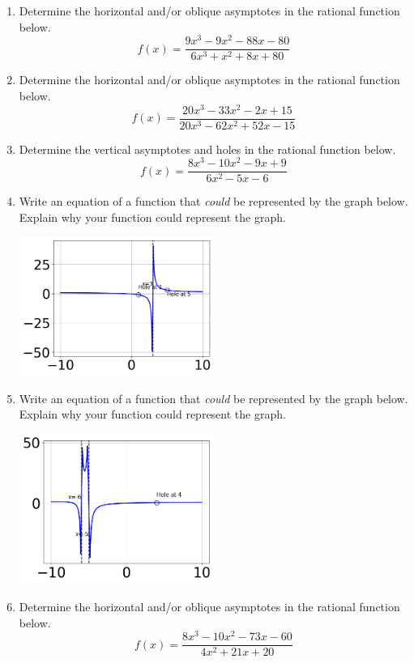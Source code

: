 \documentclass[14pt]{extbook}
\begin{document}
\begin{enumerate}
\item{
Determine the horizontal and/or oblique asymptotes in the rational function below.\[ f(x) = \frac{9x^{3} -9 x^{2} -88 x -80}{6x^{3} + x^{2} +8 x + 80} \]} \newpage
\item{
Determine the horizontal and/or oblique asymptotes in the rational function below.\[ f(x) = \frac{20x^{3} -33 x^{2} -2 x + 15}{20x^{3} -62 x^{2} +52 x -15} \]} \newpage
\item{
Determine the vertical asymptotes and holes in the rational function below.\[ f(x) = \frac{8x^{3} -10 x^{2} -9 x + 9}{6x^{2} -5 x -6} \]} \newpage
\item{
Write an equation of a function that \textit{could} be represented by the graph below. Explain why your function could represent the graph.
\begin{center}
    \includegraphics[width=0.5\textwidth]{../Figures/identifyGraphOfRationalFunctionB.png}
\end{center}
} \newpage
\item{
Write an equation of a function that \textit{could} be represented by the graph below. Explain why your function could represent the graph.
\begin{center}
    \includegraphics[width=0.5\textwidth]{../Figures/identifyGraphOfRationalFunctionCopyB.png}
\end{center}
} \newpage
\item{
Determine the horizontal and/or oblique asymptotes in the rational function below.\[ f(x) = \frac{8x^{3} -10 x^{2} -73 x -60}{4x^{2} +21 x + 20} \]} \newpage

\end{enumerate}
\end{document}
